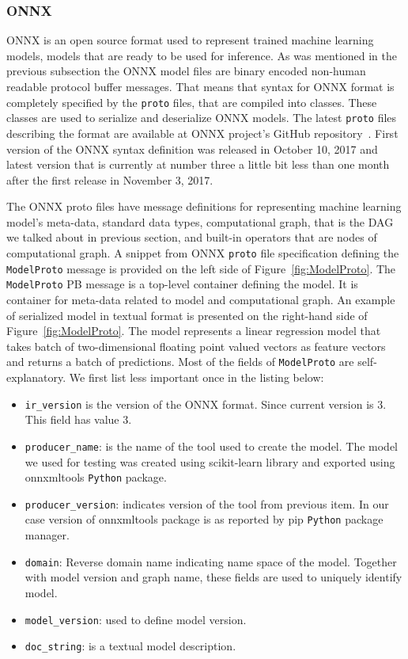 \documentclass[english, 12pt, a4paper, elec, utf8, online]{aaltothesis}
\begin{document}
\subsubsection{ONNX}
ONNX is an open source format used to represent trained machine learning models, models that are ready to be used for inference. As was mentioned in the previous subsection the ONNX model files are binary encoded non-human readable protocol buffer messages. That means that syntax for ONNX format is completely specified by the \texttt{proto} files, that are compiled into classes. These classes are used to serialize and deserialize ONNX models. The latest \texttt{proto} files describing the format are available at ONNX project's GitHub repository~\cite{onnx_github}. First version of the ONNX syntax definition was released in October 10, 2017 and latest version that is currently at number three a little bit less than one month after the first release in November 3, 2017.

The ONNX proto files have message definitions for representing machine learning model's meta-data, standard data types, computational graph, that is the DAG we talked about in previous section, and built-in operators that are nodes of computational graph. A snippet from ONNX \texttt{proto} file specification defining the \texttt{ModelProto} message is provided on the left side of Figure~\ref{fig:ModelProto}. The \texttt{ModelProto} PB message is a top-level container defining the model. It is container for meta-data related to model and computational graph. An example of serialized model in textual format is presented on the right-hand side of Figure~\ref{fig:ModelProto}. The model represents a linear regression model that takes batch of two-dimensional floating point valued vectors as feature vectors and returns a batch of predictions. Most of the fields of \texttt{ModelProto} are self-explanatory. We first list less important once in the listing below:

\begin{itemize}
\item
\texttt{ir\_version} is the version of the ONNX format. Since current version is 3. This field has value 3.
\item
\texttt{producer\_name}: is the name of the tool used to create the model. The model we used for testing was created using scikit-learn library and exported using onnxmltools \texttt{Python} package.
\item
\texttt{producer\_version}: indicates version of the tool from previous item. In our case version of onnxmltools package is as reported by pip \texttt{Python} package manager.
\item
\texttt{domain}: Reverse domain name indicating name space of the model. Together with model version and graph name, these fields are used to uniquely identify model.
\item
\texttt{model\_version}: used to define model version.
\item
\texttt{doc\_string}: is a textual model description. 
\end{itemize}
\end{document}
